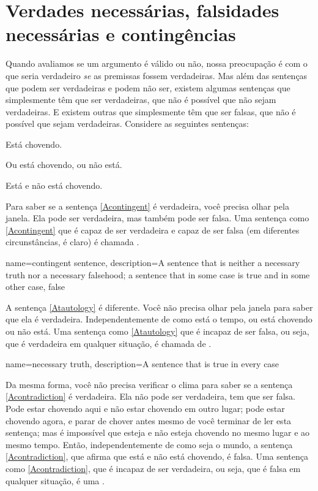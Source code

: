 \section[Verdades e falsidades necessárias e contingência]{Verdades necessárias, falsidades necessárias e contingências}

Quando avaliamos se um argumento é válido ou não, nossa preocupação é com o que seria verdadeiro \emph{se} as premissas fossem verdadeiras.
Mas além das sentenças que podem ser verdadeiras e podem não ser, existem algumas sentenças que simplesmente têm que ser verdadeiras, que não é possível que não sejam verdadeiras.
E existem outras que simplesmente têm que ser falsas, que não é possível que sejam verdadeiras.
Considere as seguintes sentenças:
	\begin{earg}
		\item[\ex{Acontingent}] Está chovendo.
		\item[\ex{Atautology}] Ou está chovendo, ou não está.
		\item[\ex{Acontradiction}] Está e não está chovendo.
	\end{earg}
Para saber se a sentença \ref{Acontingent} é verdadeira, você precisa olhar pela janela. Ela pode ser verdadeira, mas também pode ser falsa.
Uma sentença como \ref{Acontingent} que é capaz de ser verdadeira e capaz de ser falsa (em diferentes circunstâncias, é claro) é chamada .

{
name=contingent sentence,
description={A sentence that is neither a \gls{necessary truth} nor a \gls{necessary falsehood}; a sentence that in some case is true and in some other case, false}
}

A sentença \ref{Atautology} é diferente.
Você não precisa olhar pela janela para saber que ela é verdadeira. Independentemente de como está o tempo, ou está chovendo ou não está.
Uma sentença como \ref{Atautology} que é incapaz de ser falsa, ou seja, que é verdadeira em qualquer situação, é chamada de .

{
name={necessary truth},
description={A sentence that is true in every case}
}

Da mesma forma, você não precisa verificar o clima para saber se a sentença \ref{Acontradiction} é verdadeira.
Ela não pode ser verdadeira, tem que ser falsa.
Pode estar chovendo aqui e não estar chovendo em outro lugar; pode estar chovendo agora, e parar de chover antes mesmo de você terminar de ler esta sentença; mas é impossível que esteja e não esteja chovendo no mesmo lugar e ao mesmo tempo.
Então, independentemente de como seja o mundo, a sentença \ref{Acontradiction}, que afirma que está e não está chovendo, é falsa.
Uma sentença como \ref{Acontradiction}, que é incapaz de ser verdadeira, ou seja, que é falsa em qualquer situação, é uma .

